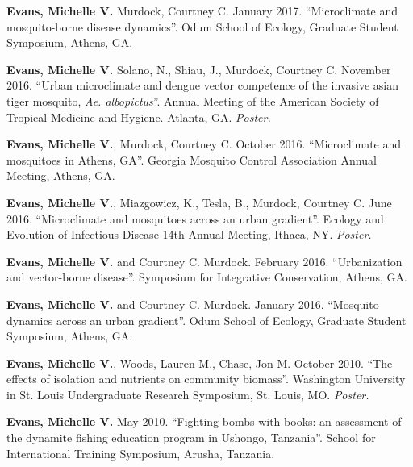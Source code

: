 
\begin{cvitems}
	\bigskip

	\item \textbf{Evans, Michelle V.} Murdock, Courtney C. January 2017. ``Microclimate and mosquito-borne disease dynamics''. Odum School of Ecology, Graduate Student Symposium, Athens, GA.

	\item \textbf{Evans, Michelle V.} Solano, N., Shiau, J., Murdock, Courtney C. November 2016. ``Urban microclimate and dengue vector competence of the invasive asian tiger mosquito, \textit{Ae. albopictus}''. Annual Meeting of the American Society of Tropical Medicine and Hygiene. Atlanta, GA. \textit{Poster.}

	\item \textbf{Evans, Michelle V.}, Murdock, Courtney C. October 2016. ``Microclimate and mosquitoes in Athens, GA''. Georgia Mosquito Control Association Annual Meeting, Athens, GA.

	\item \textbf{Evans, Michelle V.}, Miazgowicz, K., Tesla, B., Murdock, Courtney C. June 2016. ``Microclimate and mosquitoes across an urban gradient''. Ecology and Evolution of Infectious Disease 14th Annual Meeting, Ithaca, NY. \textit{Poster.}

	\item \textbf{Evans, Michelle V.} and Courtney C. Murdock. February 2016. ``Urbanization and vector-borne disease''. Symposium for Integrative Conservation, Athens, GA.

	\item \textbf{Evans, Michelle V.} and Courtney C. Murdock. January 2016. ``Mosquito dynamics across an urban gradient''. Odum School of Ecology, Graduate Student Symposium, Athens, GA.

	\item \textbf{Evans, Michelle V.}, Woods, Lauren M., Chase, Jon M. October 2010. ``The effects of isolation and nutrients on community biomass''. Washington University in St. Louis Undergraduate Research Symposium, St. Louis, MO. \textit{Poster.}

	\item \textbf{Evans, Michelle V.} May 2010. ``Fighting bombs with books: an assessment of the dynamite fishing education program in Ushongo, Tanzania''. School for International Training Symposium, Arusha, Tanzania.

	\bigskip
\end{cvitems}
